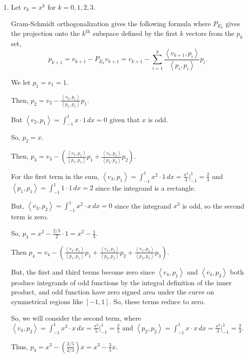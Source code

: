 \documentclass{article}
\begin{document}
\begin{enumerate}[label=(\alph*)]
  \item Let $v_{k}=x^{k}$ for $k=0,1,2,3$.

    Gram-Schmidt orthogonalization gives the following formula where $P_{E_k}$ gives the projection onto the $k^{\text{th}}$ subspace defined by the first $k$ vectors from the $p_k$ set,
    \[
      p_{k+1}=v_{k+1}-P_{E_{k}}v_{k+1}=v_{k+1}-\sum_{i=1}^{k}\frac{\left<v_{k+1},p_i\right>}{\left<p_i,p_i \right>}p_i
    .\] 

    We let $p_1=v_1=1$. 

    Then, $p_2=v_2-\frac{\left<v_2,p_1 \right>}{\left<p_1,p_1 \right>}p_1$. 

    But $\left<v_2,p_1 \right> = \int_{-1}^{1} x\cdot1\,dx=0$ given that $x$ is odd. 

    So, $p_2=x$.

    Then, $p_3=v_3-\left( \frac{\left<v_3,p_1 \right>}{\left<p_1,p_1 \right>}p_1+\frac{\left<v_3,p_2 \right>}{\left<p_2,p_2 \right>}p_2 \right)$. 

    For the first term in the sum, $\left<v_3,p_1 \right> = \int_{-1}^{1} x^2\cdot 1\,dx = \frac{x^3}{3} \vert_{-1}^{1} = \frac{2}{3}$
    and $\left<p_1,p_1 \right> = \int_{-1}^{1} 1\cdot 1\,dx = 2$ since the integrand is a rectangle.

    But, $\left<v_3,p_2 \right> = \int_{-1}^{1} x^2\cdot x\,dx = 0$ since the integrand $x^3$ is odd, so the second term is zero. 

    So, $p_3=x^2-\frac{2 / 3}{2}\cdot 1=x^2-\frac{1}{3}$. 

    Then $p_4=v_4-\left( \frac{\left<v_4,p_1 \right>}{\left<p_1,p_1 \right>}p_1+\frac{\left<v_4,p_2 \right>}{\left<p_2,p_2 \right>}p_2+\frac{\left<v_4,p_3 \right>}{\left<p_3,p_3 \right>}p_3 \right)$.

    But, the first and third terms become zero since $\left<v_4,p_1 \right>$ and $\left<v_4,p_3 \right>$ both produce integrands of odd functions by the integral definition of the inner product, and odd function have zero signed area under the curve on symmetrical regions like $[-1,1]$. So, these terms reduce to zero.

    So, we will consider the second term, where $\left<v_4,p_2 \right> = \int_{-1}^{1} x^3\cdot x\,dx = \frac{x^5}{5} \vert_{-1}^{1} = \frac{2}{5}$ and $\left<p_2,p_2 \right> = \int_{-1}^{1} x\cdot x\,dx = \frac{x^3}{3} \vert_{-1}^{1} = \frac{2}{3}$. 

    Thus, $p_4=x^{3}-\left( \frac{2 / 5}{2 / 3} \right)x = x^{3}-\frac{3}{5}x$. 


\end{enumerate}
\end{document}
